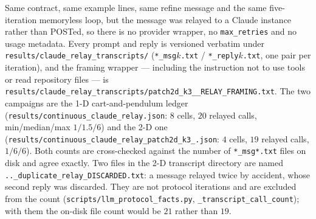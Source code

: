 Same contract, same example lines, same refine message and the same five-iteration
memoryless loop, but the message was relayed to a Claude instance rather than
POSTed, so there is no provider wrapper, no \texttt{max\_retries} and no usage
metadata. Every prompt and reply is versioned verbatim under
\texttt{results/\allowbreak claude\_\allowbreak relay\_\allowbreak transcripts/\allowbreak } (\texttt{*\_msg$k$.txt} /
\texttt{*\_reply$k$.txt}, one pair per iteration), and the framing wrapper ---
including the instruction not to use tools or read repository files --- is
\texttt{results/\allowbreak claude\_\allowbreak relay\_\allowbreak transcripts/\allowbreak patch2d\_\allowbreak k3\_\_\allowbreak RELAY\_\allowbreak FRAMING.\allowbreak txt}.
The two campaigns are the 1-D cart-and-pendulum ledger
(\texttt{results/\allowbreak continuous\_\allowbreak claude\_\allowbreak relay.\allowbreak json}: $8$ cells, $20$ relayed calls,
min/median/max $1/1.5/6$) and the 2-D one
(\texttt{results/\allowbreak continuous\_\allowbreak claude\_\allowbreak relay\_\allowbreak patch2d\_\allowbreak k3\_.\allowbreak json}: $4$ cells, $19$
relayed calls, $1/6/6$). Both counts are cross-checked against the number of
\texttt{*\_msg*.txt} files on disk and agree exactly. Two files in the 2-D
transcript directory are named \texttt{.\allowbreak .\allowbreak \_\allowbreak duplicate\_\allowbreak relay\_\allowbreak DISCARDED.\allowbreak txt}: a
message relayed twice by accident, whose second reply was discarded. They are not
protocol iterations and are excluded from the count
(\texttt{scripts/\allowbreak llm\_\allowbreak protocol\_\allowbreak facts.\allowbreak py}, \texttt{\_\allowbreak transcript\_\allowbreak call\_\allowbreak count});
with them the on-disk file count would be $21$ rather than $19$.
